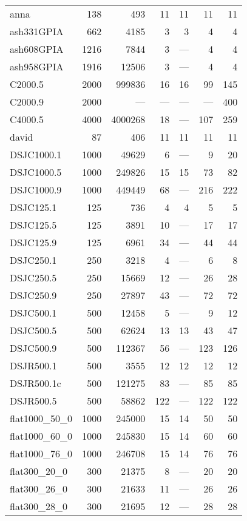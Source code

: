 \begin{longtable}{lrrrrrr}
  anna & 138 & 493 & 11 & 11 & 11 & 11 \\ 
  ash331GPIA & 662 & 4185 & 3 & 3 & 4 & 4 \\ 
  ash608GPIA & 1216 & 7844 & 3 & --- & 4 & 4 \\ 
  ash958GPIA & 1916 & 12506 & 3 & --- & 4 & 4 \\ 
  C2000.5 & 2000 & 999836 & 16 & 16 & 99 & 145 \\ 
  C2000.9 & 2000 & --- & --- & --- & --- & 400 \\ 
  C4000.5 & 4000 & 4000268 & 18 & --- & 107 & 259 \\ 
  david & 87 & 406 & 11 & 11 & 11 & 11 \\ 
  DSJC1000.1 & 1000 & 49629 & 6 & --- & 9 & 20 \\ 
  DSJC1000.5 & 1000 & 249826 & 15 & 15 & 73 & 82 \\ 
  DSJC1000.9 & 1000 & 449449 & 68 & --- & 216 & 222 \\ 
  DSJC125.1 & 125 & 736 & 4 & 4 & 5 & 5 \\ 
  DSJC125.5 & 125 & 3891 & 10 & --- & 17 & 17 \\ 
  DSJC125.9 & 125 & 6961 & 34 & --- & 44 & 44 \\ 
  DSJC250.1 & 250 & 3218 & 4 & --- & 6 & 8 \\ 
  DSJC250.5 & 250 & 15669 & 12 & --- & 26 & 28 \\ 
  DSJC250.9 & 250 & 27897 & 43 & --- & 72 & 72 \\ 
  DSJC500.1 & 500 & 12458 & 5 & --- & 9 & 12 \\ 
  DSJC500.5 & 500 & 62624 & 13 & 13 & 43 & 47 \\ 
  DSJC500.9 & 500 & 112367 & 56 & --- & 123 & 126 \\ 
  DSJR500.1 & 500 & 3555 & 12 & 12 & 12 & 12 \\ 
  DSJR500.1c & 500 & 121275 & 83 & --- & 85 & 85 \\ 
  DSJR500.5 & 500 & 58862 & 122 & --- & 122 & 122 \\ 
  flat1000\_50\_0 & 1000 & 245000 & 15 & 14 & 50 & 50 \\ 
  flat1000\_60\_0 & 1000 & 245830 & 15 & 14 & 60 & 60 \\ 
  flat1000\_76\_0 & 1000 & 246708 & 15 & 14 & 76 & 76 \\ 
  flat300\_20\_0 & 300 & 21375 & 8 & --- & 20 & 20 \\ 
  flat300\_26\_0 & 300 & 21633 & 11 & --- & 26 & 26 \\ 
  flat300\_28\_0 & 300 & 21695 & 12 & --- & 28 & 28 \\ 

\end{longtable}
